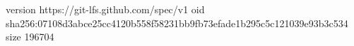 version https://git-lfs.github.com/spec/v1
oid sha256:07108d3abce25cc4120b558f58231bb9fb73efade1b295c5c121039e93b3c534
size 196704
